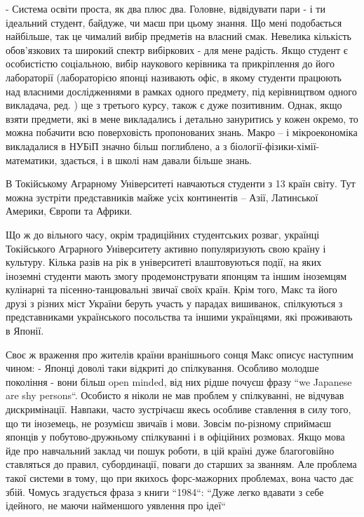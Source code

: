 \documentclass[10pt,a4paper]{article}
\begin{document}
\begin{multicols}{3}
- Система освіти проста, як два плюс два. Головне, відвідувати пари - і ти ідеальний студент, байдуже, чи маєш при цьому знання. Що мені подобається найбільше, так це чималий вибір предметів на власний смак. Невелика кількість обов'язкових та широкий спектр вибіркових - для мене радість. Якщо студент є особистістю соціальною, вибір наукового керівника та прикріплення до його лабораторії (лабораторією японці називають офіс, в якому студенти працюють над власними дослідженнями в рамках одного предмету, під керівництвом одного викладача, ред. ) ще з третього курсу, також є дуже позитивним. Однак, якщо взяти предмети, які в мене викладались і детально зануритись у кожен окремо, то можна побачити всю поверховість пропонованих знань. Макро – і мікроекономіка викладалися в НУБіП значно більш поглиблено, а з біології-фізики-хімії-математики, здається, і в школі нам давали більше знань.

В Токійському Аграрному Університеті навчаються студенти з 13 країн світу. Тут можна зустріти представників майже усіх континентів – Азії, Латинської Америки, Європи та Африки.

Що ж до вільного часу, окрім традиційних студентських розваг, українці Токійського Аграрного Університету активно популяризують свою країну і культуру. Кілька разів на рік в університеті влаштовуються події, на яких іноземні студенти мають змогу продемонструвати японцям та іншим іноземцям кулінарні та пісенно-танцювальні звичаї своїх країн. Крім того, Макс та його друзі з різних міст України беруть участь у парадах вишиванок, спілкуються з представниками українського посольства та іншими українцями, які проживають в Японії.

Своє ж враження про жителів країни вранішнього сонця Макс описує наступним чином:   - Японці доволі таки відкриті до спілкування. Особливо молодше покоління - вони більш open minded, від них рідше почуєш фразу  ``we Japanese are shy persons``. Особисто я ніколи не мав проблем у спілкуванні, не відчував дискримінації. Навпаки, часто зустрічаєш якесь особливе ставлення в силу того, що ти іноземець, не розумієш звичаїв і мови. Зовсім по-різному сприймаєш японців у побутово-дружньому спілкуванні і в офіційних розмовах. Якщо мова йде про навчальний заклад чи пошук роботи, в цій країні дуже благоговійно ставляться до правил, субординації, поваги до старших за званням. Але проблема такої системи в тому, що при якихось форс-мажорних проблемах, вона часто дає збій. Чомусь згадується фраза з книги ``1984``: ``Дуже легко вдавати з себе ідейного, не маючи найменшого уявлення про ідеї``


\end{multicols}
\end{document}
